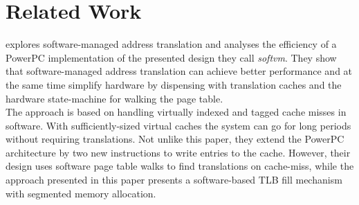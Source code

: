 \chapter{Related Work}

\label{chap:related}



\cite{jacobSoftwaremanagedAddressTranslation1997} explores software-managed
address translation and analyses the efficiency of a PowerPC implementation
of the presented design they call \textit{softvm}. They show that
software-managed address translation can achieve better performance and
at the same time simplify hardware by dispensing with translation caches and
the hardware state-machine for walking the page table.\\
The approach is based on handling virtually indexed and tagged cache misses in
software.
With sufficiently-sized virtual caches the system can go for long periods
without requiring translations.
Not unlike this paper, they extend the PowerPC architecture by two new instructions
to write entries to the cache. However, their design uses software page table
walks to find translations on cache-miss, while the approach presented in this
paper presents a software-based TLB fill mechanism with segmented
memory allocation.\\\\


\cite{barrTranslationCachingSkip}



